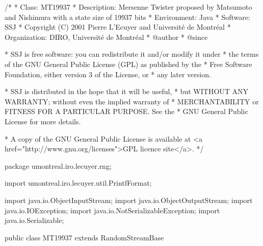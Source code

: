 \begin{code}
\begin{hide}
/*
 * Class:        MT19937
 * Description:  Mersenne Twister proposed by Matsumoto and Nishimura
                 with a state size of 19937 bits
 * Environment:  Java
 * Software:     SSJ 
 * Copyright (C) 2001  Pierre L'Ecuyer and Université de Montréal
 * Organization: DIRO, Université de Montréal
 * @author       
 * @since

 * SSJ is free software: you can redistribute it and/or modify it under
 * the terms of the GNU General Public License (GPL) as published by the
 * Free Software Foundation, either version 3 of the License, or
 * any later version.

 * SSJ is distributed in the hope that it will be useful,
 * but WITHOUT ANY WARRANTY; without even the implied warranty of
 * MERCHANTABILITY or FITNESS FOR A PARTICULAR PURPOSE.  See the
 * GNU General Public License for more details.

 * A copy of the GNU General Public License is available at
   <a href="http://www.gnu.org/licenses">GPL licence site</a>.
 */
\end{hide}
package umontreal.iro.lecuyer.rng;\begin{hide}

import umontreal.iro.lecuyer.util.PrintfFormat;

import java.io.ObjectInputStream;
import java.io.ObjectOutputStream;
import java.io.IOException;
import java.io.NotSerializableException;
import java.io.Serializable;\end{hide}

public class MT19937 extends RandomStreamBase \begin{hide} {

   private static final long serialVersionUID = 70510L;
   //La date de modification a l'envers, lire 10/05/2007

   private static final double NORM = 1.0 / 0x100000001L;   // 1/(2^32 + 1)

   private static final int N = 624;
   private static final int M = 397;
   private static final int[] MULT_MATRIX_A = {0x0, 0x9908B0DF};
   private static final int UPPER_MASK = 0x80000000;
   private static final int LOWER_MASK = 0x7FFFFFFF;

   private int[] state;
   private int state_i;

   private CloneableRandomStream seedRng;

   private void fillSeed() {
      state_i = N;

      for(int i = 0; i < N; i++)
         state[i] = (int)((long)(seedRng.nextDouble() * 0x100000000L));
   }
 \end{hide}
\end{code}

